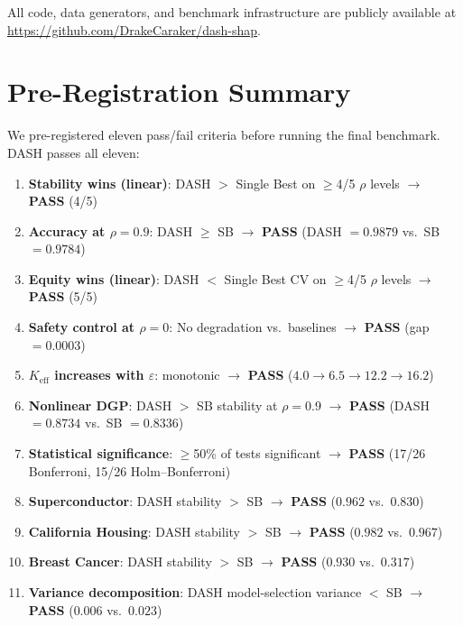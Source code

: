 \documentclass[11pt]{article}
\newcommand{\dash}{\textsc{DASH}}
\newcommand{\rhovar}{\rho}
\begin{document}
All code, data generators, and benchmark infrastructure are publicly
available at \url{https://github.com/DrakeCaraker/dash-shap}.

\section{Pre-Registration Summary}
\label{app:criteria}

We pre-registered eleven pass/fail criteria before running the final
benchmark. \dash{} passes all eleven:

\begin{enumerate}
  \item \textbf{Stability wins (linear)}: DASH $>$ Single Best on $\geq$4/5
    $\rhovar$ levels $\to$ \textbf{PASS} (4/5)
  \item \textbf{Accuracy at $\rhovar = 0.9$}: DASH $\geq$ SB $\to$
    \textbf{PASS} (DASH $= 0.9879$ vs.\ SB $= 0.9784$)
  \item \textbf{Equity wins (linear)}: DASH $<$ Single Best CV on $\geq$4/5
    $\rhovar$ levels $\to$ \textbf{PASS} (5/5)
  \item \textbf{Safety control at $\rhovar = 0$}: No degradation vs.\
    baselines $\to$ \textbf{PASS} (gap $= 0.0003$)
  \item \textbf{$K_{\text{eff}}$ increases with $\varepsilon$}: monotonic
    $\to$ \textbf{PASS} ($4.0 \to 6.5 \to 12.2 \to 16.2$)
  \item \textbf{Nonlinear DGP}: DASH $>$ SB stability at $\rhovar = 0.9$
    $\to$ \textbf{PASS} (DASH $= 0.8734$ vs.\ SB $= 0.8336$)
  \item \textbf{Statistical significance}: $\geq$50\% of tests significant
    $\to$ \textbf{PASS} (17/26 Bonferroni, 15/26 Holm--Bonferroni)
  \item \textbf{Superconductor}: DASH stability $>$ SB $\to$ \textbf{PASS}
    ($0.962$ vs.\ $0.830$)
  \item \textbf{California Housing}: DASH stability $>$ SB $\to$ \textbf{PASS}
    ($0.982$ vs.\ $0.967$)
  \item \textbf{Breast Cancer}: DASH stability $>$ SB $\to$ \textbf{PASS}
    ($0.930$ vs.\ $0.317$)
  \item \textbf{Variance decomposition}: DASH model-selection variance $<$ SB
    $\to$ \textbf{PASS} ($0.006$ vs.\ $0.023$)
\end{enumerate}
\end{document}
